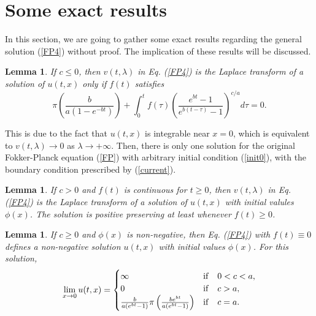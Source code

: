 \documentclass[12pt]{article}
\newtheorem{lemma}[theorem]{Lemma}
\begin{document}
\section{Some exact results}

  In this section, we are going to gather some exact results regarding the general solution (\ref{FP4}) without proof.
  The implication of these results will be discussed.

  \begin{lemma}
    If $c\le 0$, then $v(t,\lambda)$ in Eq. (\ref{FP4}) is the Laplace transform of a solution of $u(t,x)$ only if $f(t)$
    satisfies
    \begin{equation}
      \label{current}
      \pi\left(\frac{b}{a(1-e^{-bt})}\right)
                    +\int_0^tf(\tau)\left(\frac{e^{bt}-1}{e^{b(t-\tau)}-1}\right)^{c/a}d\tau = 0.
    \end{equation}
  \end{lemma}
  This is due to the fact that $u(t,x)$ is integrable near $x=0$, which is equivalent to $v(t,\lambda)\rightarrow 0$ as
  $\lambda\rightarrow +\infty$. Then, there is only one solution for the original Fokker-Planck equation (\ref{FP}) with
  arbitrary initial condition (\ref{init0}), with the boundary condition prescribed by (\ref{current}).

  \begin{lemma}
    If $c>0$ and $f(t)$ is continuous for $t\ge 0$, then $v(t,\lambda)$ in Eq. (\ref{FP4}) is the Laplace transform of a solution of $u(t,x)$ with initial valules $\phi(x)$.
    The solution is positive preserving at least whenever $f(t)\ge 0$.
  \end{lemma}

  \begin{lemma}
    If $c\ge 0$ and $\phi(x)$ is non-negative, then Eq. (\ref{FP4})
    with $f(t)\equiv 0$ defines a non-negative solution $u(t,x)$ with
    initial values $\phi(x)$. For this solution,
    \begin{equation*}
      \lim_{x\rightarrow 0}u(t,x)=
      \begin{cases}
        \infty & {\rm if} \quad 0<c<a, \\
        0      & {\rm if} \quad c>a,   \\
        \frac{b}{a(e^{bt}-1)}\pi\left(\frac{be^{bt}}{a(e^{bt}-1)}\right) & {\rm if} \quad c=a.
      \end{cases}
    \end{equation*}
  \end{lemma}
\end{document}
